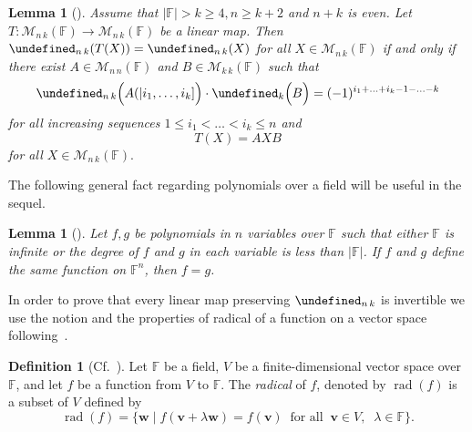 \documentclass{elsarticle}
\DeclareMathOperator{\rad}{rad}
\def\F{{\mathbb F}}
\def\M{{\mathcal M}}
\let\det\undefined
\DeclareMathOperator{\det}{det}
\theoremstyle{plain}
\newtheorem{lemma}[theorem]{Lemma}
\theoremstyle{definition}
\newtheorem{definition}[theorem]{Definition}
\numberwithin{equation}{section}
\begin{document}
\begin{lemma}[{\cite[Theorem~5.14]{Guterman2025}}]\label{lem:MainTheoremEven}Assume that $|\F| > k \ge 4, n \ge k + 2$ and  $n + k$ is even. Let $T\colon \M_{n\, k} (\F) \to \M_{n\, k} (\F)$ be a linear map. Then $\det_{n\, k} (T(X)) = \det_{n\,k}(X)$ for all $X \in \M_{n\, k} (\F)$ if and only if there exist $A \in \M_{n\, n}(\F)$ and $B \in \M_{k\, k}(\F)$ such that
\begin{equation}\label{thm:MainTheoremEvenKGe4:eq}
\det_{n\, k} \Bigl(A(|i_1,\ldots, i_k]\Bigr) \cdot \det_k \Bigl(B\Bigr) = (-1)^{i_1 + \ldots + i_k - 1 - \ldots - k}
\end{equation}
for all increasing sequences $1 \le i_1 < \ldots < i_k \le n $ and
\[
T(X) = AXB
\]
for all $X \in \M_{n\, k} (\F).$
\end{lemma}


The following general fact regarding polynomials over a field will be useful in the sequel. 


\begin{lemma}[{\cite[Corollary~2.13]{Guterman2025}}]\label{DegFGLessEqual}Let $f, g$ be
polynomials in $n$ variables over $\F$ such that either $\F$ is infinite or the degree of $f$ and $g$ in each variable
is less than $|\F|$. If $f$ and $g$ define the same function on $\F^{n}$, then $f = g$.
\end{lemma}

In order to prove that every linear map preserving $\det_{n\,k}$ is invertible we use the notion and the properties of radical of a function on a vector space following~\cite{Waterhouse1983}.

\begin{definition}[Cf.~{\cite[text at the beginning of Section~1]{Waterhouse1983}}]\label{def:radical}Let $\F$ be a field, $V$ be a finite-dimensional vector space over $\F$, and let $f$ be a function from $V$ to $\F$. The \emph{radical} of $f$, denoted by $\rad (f)$ is a subset of $V$ defined by
\[
\rad (f) = \{\mathbf w \mid f(\mathbf v + \lambda \mathbf w) = f(\mathbf v)\;\;\mbox{for all}\;\; \mathbf v \in V,\;\; \lambda \in \F\}.
\]
\end{definition}
\end{document}
